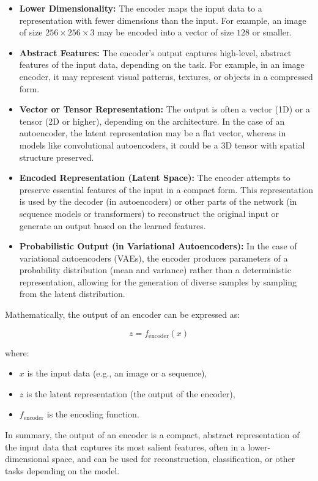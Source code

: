 \begin{itemize}
    \item \textbf{Lower Dimensionality:} The encoder maps the input data to a representation with fewer dimensions than the input. For example, an image of size \( 256 \times 256 \times 3 \) may be encoded into a vector of size \( 128 \) or smaller.
    
    \item \textbf{Abstract Features:} The encoder's output captures high-level, abstract features of the input data, depending on the task. For example, in an image encoder, it may represent visual patterns, textures, or objects in a compressed form.
    
    \item \textbf{Vector or Tensor Representation:} The output is often a vector (1D) or a tensor (2D or higher), depending on the architecture. In the case of an autoencoder, the latent representation may be a flat vector, whereas in models like convolutional autoencoders, it could be a 3D tensor with spatial structure preserved.
    
    \item \textbf{Encoded Representation (Latent Space):} The encoder attempts to preserve essential features of the input in a compact form. This representation is used by the decoder (in autoencoders) or other parts of the network (in sequence models or transformers) to reconstruct the original input or generate an output based on the learned features.
    
    \item \textbf{Probabilistic Output (in Variational Autoencoders):} In the case of variational autoencoders (VAEs), the encoder produces parameters of a probability distribution (mean and variance) rather than a deterministic representation, allowing for the generation of diverse samples by sampling from the latent distribution.
\end{itemize}

Mathematically, the output of an encoder can be expressed as:

\[
z = f_{\text{encoder}}(x)
\]

where:
\begin{itemize}
    \item \( x \) is the input data (e.g., an image or a sequence),
    \item \( z \) is the latent representation (the output of the encoder),
    \item \( f_{\text{encoder}} \) is the encoding function.
\end{itemize}

In summary, the output of an encoder is a compact, abstract representation of the input data that captures its most salient features, often in a lower-dimensional space, and can be used for reconstruction, classification, or other tasks depending on the model.
